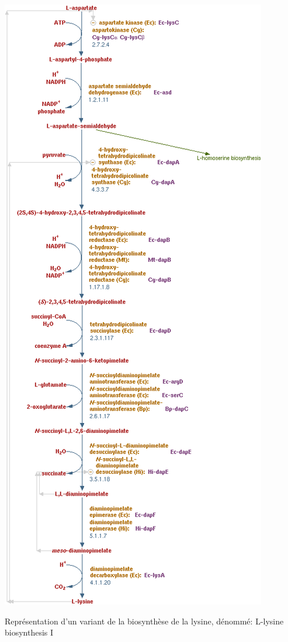\begin{refsegment}
    \begin{shadedfigure}[H]
        \centering
        \includegraphics[height=0.8\textheight]{img/lysine_biosynthesis_1_metacyc.png}
        \caption{Représentation d'un variant de la biosynthèse de la lysine, dénommé: L-lysine biosynthesis I }
        \label{fig:metacyc_lysine}
    \end{shadedfigure}
    

\end{refsegment}
